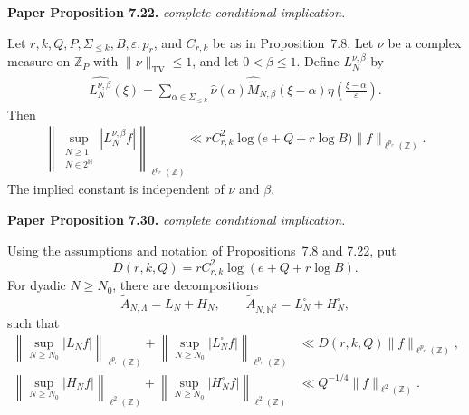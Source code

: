 \begin{lemma}
\label{iw_low_high}
\leanok
\par\medskip\noindent\textbf{Paper Proposition 7.22.} \textit{complete conditional implication.}\par
Let \(r,k,Q,P,\Sigma_{\leq k},B,\varepsilon,p_r\), and
\(C_{r,k}\) be as in Proposition~\textup{7.8}.
Let \(\nu\) be a complex measure on \(\mathbb Z_P\) with
\(\|\nu\|_{\mathrm{TV}}\leq1\), and let \(0<\beta\leq1\).  Define
\(L_N^{\nu,\beta}\) by
\begin{align}
 \widehat{L_N^{\nu,\beta}}(\xi)
 =
 \sum_{\alpha\in\Sigma_{\leq k}}
 \widehat\nu(\alpha)
 \widehat{\widetilde M}_{N,\beta}(\xi-\alpha)
 \eta\left(\frac{\xi-\alpha}{\varepsilon}\right).
\end{align}
Then
\begin{align}
 \left\|
 \sup_{\substack{N\geq1\\N\in2^{\mathbb N}}}
 |L_N^{\nu,\beta}f|
 \right\|_{\ell^{p_r}(\mathbb Z)}
 \ll
 rC_{r,k}^2
 \log\bigl(e+Q+r\log B\bigr)
 \|f\|_{\ell^{p_r}(\mathbb Z)}.
\end{align}
The implied constant is independent of \(\nu\) and \(\beta\).
\par\medskip\noindent\textbf{Paper Proposition 7.30.} \textit{complete conditional implication.}\par
Using the assumptions and notation of
Propositions~\textup{7.8} and \textup{7.22}, put
\begin{equation}
 D(r,k,Q)=rC_{r,k}^2\log(e+Q+r\log B).
\end{equation}
For dyadic \(N\geq N_0\), there are decompositions
\[
 \widetilde A_{N,\Lambda}=L_N+H_N,
 \qquad
 \widetilde A_{N,\mathbb N^2}=L_N^\square+H_N^\square,
\]
such that
\begin{align}
 \left\|\sup_{N\geq N_0}|L_Nf|\right\|_{\ell^{p_r}(\mathbb Z)}
 +
 \left\|\sup_{N\geq N_0}|L_N^\square f|\right\|_{\ell^{p_r}(\mathbb Z)}
 &\ll D(r,k,Q)\|f\|_{\ell^{p_r}(\mathbb Z)},
 \\
 \left\|\sup_{N\geq N_0}|H_Nf|\right\|_{\ell^2(\mathbb Z)}
 +
 \left\|\sup_{N\geq N_0}|H_N^\square f|\right\|_{\ell^2(\mathbb Z)}
 &\ll Q^{-1/4}\|f\|_{\ell^2(\mathbb Z)}.
\end{align}
\end{lemma}
